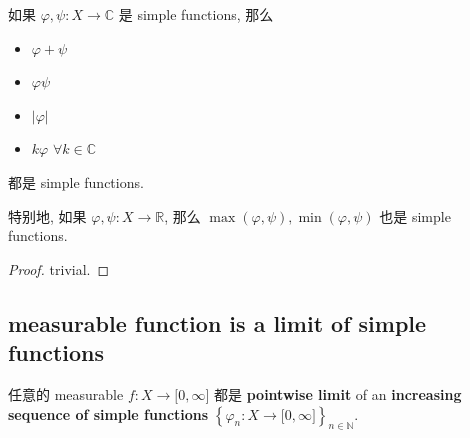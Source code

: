 \begin{lemma}

如果 \(\varphi,\psi:X\rightarrow\mathbb{C}\) 是 simple functions, 那么

\begin{itemize}
\item
  \(\varphi + \psi\)
\item
  \(\varphi\psi\)
\item
  \(|\varphi|\)
\item
  \(k\varphi\) \(\forall k \in \mathbb{C}\)
\end{itemize}

都是 simple functions.

特别地, 如果 \(\varphi,\psi:X\rightarrow\mathbb{R}\), 那么 \(\max(\varphi,\psi),\min(\varphi,\psi)\) 也是 simple functions.

\end{lemma}

\begin{proof}

trivial.

\end{proof}

\subsection{measurable function is a limit of simple functions}\label{measurable-function-is-a-limit-of-simple-functions}

\begin{theorem}{}\label{thm-04-measurable-functions-and-integration-on-l-mu-approximating-a-nonneg-measurable-function-by-simple-function}

任意的 measurable \(f:X\rightarrow\lbrack 0,\infty\rbrack\) 都是 \textbf{pointwise limit} of an \textbf{increasing sequence of simple functions} \(\left\{ {\varphi_{n}:X\rightarrow\lbrack 0,\infty\rbrack} \right\}_{n \in \mathbb{N}}\).

\end{theorem}

